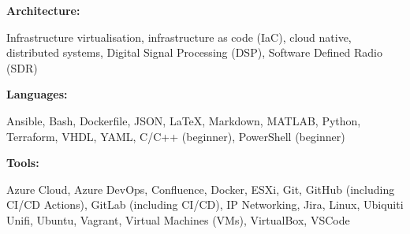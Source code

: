 \location{}
\newline
\vspace{0.02em}
\textbf{Architecture:} \newline
\vspace{-\topsep}
\vspace{-0.4em}
\begin{tightemize}
    \item Infrastructure virtualisation, infrastructure as code (IaC), cloud native, distributed systems, Digital Signal Processing (DSP), Software Defined Radio (SDR)
\end{tightemize}
\vspace{0.02em}
\textbf{Languages:} \newline
\vspace{-\topsep}
\vspace{-0.4em}
\begin{tightemize}
    \item Ansible, Bash, Dockerfile, JSON, \LaTeX{}, Markdown, MATLAB, Python, Terraform, VHDL, YAML, C/C++ (beginner), PowerShell (beginner)
\end{tightemize}
\vspace{0.02em}
\textbf{Tools:} \newline
\vspace{-\topsep}
\vspace{-0.4em}
\begin{tightemize}
    \item Azure Cloud, Azure DevOps, Confluence, Docker, ESXi, Git, GitHub (including CI/CD Actions), GitLab (including CI/CD), IP Networking, Jira, Linux, Ubiquiti Unifi, Ubuntu, Vagrant, Virtual Machines (VMs), VirtualBox, VSCode
\end{tightemize}

\vspace{0.25em}


\sectionsep{}
